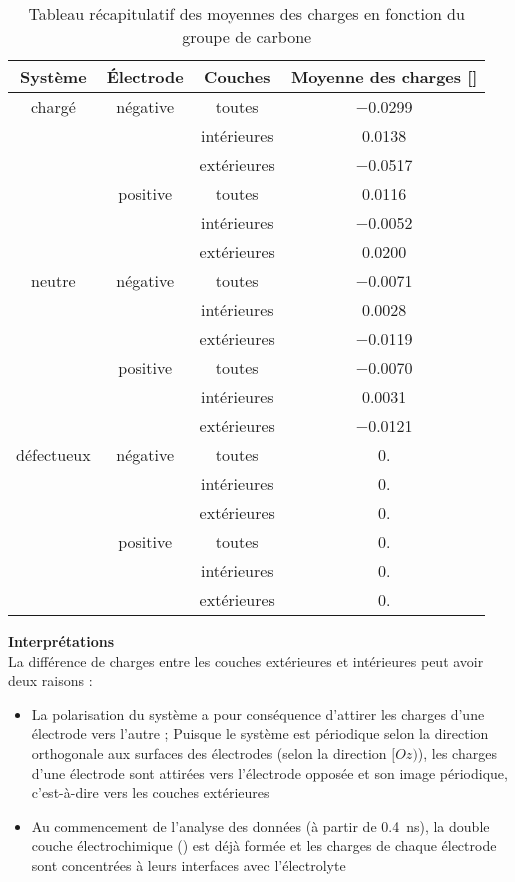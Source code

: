 \begin{table}[h!]
    \centering
    \begin{tabular}{c | c | c || c}
        \hline
        Système &Électrode &Couches &Moyenne des charges [\unit{\e}]\\
        \hline
        chargé &négative &toutes &\num{-0.0299}\\
         & &intérieures &\num{0.0138}\\
         & &extérieures &\num{-0.0517}\\
         &positive &toutes &\num{0.0116}\\
         & &intérieures &\num{-0.0052}\\
         & &extérieures &\num{0.0200}\\
        \hline
        neutre &négative &toutes &\num{-0.0071}\\
         & &intérieures &\num{0.0028}\\
         & &extérieures &\num{-0.0119}\\
         &positive &toutes &\num{-0.0070}\\
         & &intérieures &\num{0.0031}\\
         & &extérieures &\num{-0.0121}\\
        \hline
        défectueux &négative &toutes &\num{.}\\
         & &intérieures &\num{.}\\
         & &extérieures &\num{.}\\
         &positive &toutes &\num{.}\\
         & &intérieures &\num{.}\\
         & &extérieures &\num{.}\\
        \hline
    \end{tabular}
    \caption{Tableau récapitulatif des moyennes des charges en fonction du groupe de carbone}
    \label{tab:comparaison_charges}
\end{table}

\textbf{Interprétations}\\
La différence de charges entre les couches extérieures et intérieures peut avoir deux raisons :
\begin{itemize}
    \item La polarisation du système a pour conséquence d'attirer les charges d'une électrode vers l'autre ; Puisque le système est périodique selon la direction orthogonale aux surfaces des électrodes (selon la direction $[Oz)$), les charges d'une électrode sont attirées vers l'électrode opposée et son image périodique, c'est-à-dire vers les couches extérieures
    \item Au commencement de l'analyse des données (à partir de \qty{0.4}{\nano \second}), la double couche électrochimique (\edl{}) est déjà formée et les charges de chaque électrode sont concentrées à leurs interfaces avec l'électrolyte
\end{itemize}

